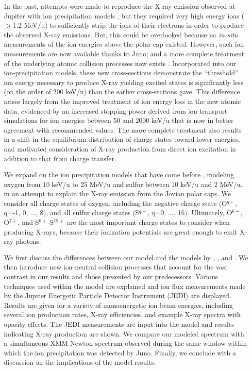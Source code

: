 \documentclass[draft]{agujournal2018}
\begin{document}
In the past, attempts were made to reproduce the X-ray emission observed at Jupiter with ion precipitation models \citep{cravens1995,cravens2003,ozak2010,ozak2013}, but they required very high energy ions ($>$1.2 MeV/u) to sufficiently strip the ions of their electrons in order to produce the observed X-ray emissions.
But, this could be overlooked because no \textit{in situ} measurements of the ion energies above the polar cap existed.
However, such ion measurements are now available thanks to Juno; and a more complete treatment of the underlying atomic collision processes now exists \citep{gharibnejad2019,schultz2019}.
Incorporated into our ion-precipitation models, these new cross-sections demonstrate the ``threshold'' ion energy necessary to produce X-ray yielding excited states is significantly less (on the order of 200 keV/u) than the earlier cross-sections gave.
This difference arises largely from the improved treatment of ion energy loss in the new atomic data, evidenced by an increased stopping power derived from ion-transport simulations for ion energies between 50 and 2000 keV/u that is now in better agreement with recommended values.
The more complete treatment also results in a shift in the equilibrium distribution of charge states toward lower energies, and motivated consideration of X-ray production from direct ion excitation in addition to that from charge transfer.

We expand on the ion precipitation models that have come before \citep{cravens1995,houston2018,ozak2010,ozak2013}, modeling oxygen from 10 keV/u to 25 MeV/u and sulfur between 10 keV/u and 2 MeV/u, in an attempt to explain the X-ray emission from the Jovian polar caps.
We consider all charge states of oxygen, including the negative charge state (O$^{q+}$, q=-1, 0, ..., 8), and all sulfur charge states (S$^{q+}$, q=0, ..., 16).
Ultimately, O$^{6+}$, O$^{7+}$, and S$^{6+}$-S$^{15+}$ are the most important charge states to consider when producing X-rays, because their ionization potentials are great enough to emit X-ray photons.

We first discuss the differences between our model and the models by \citet{houston2018}, \citet{ozak2010}, and \citet{ozak2013}.
We then introduce new ion-neutral collision processes that account for the vast contrast in our results and those presented by our predecessors.
Various techniques used within the model are explained and ion flux measurements made by the Jupiter Energetic Particle Detector Instrument (JEDI) \citep{mauk2017ssr} are displayed.
Results are given for a variety of monoenergetic ion beam energies, including several ion production rates, X-ray efficiencies, and example X-ray spectra with opacity effects.
The JEDI measurements are input into the model and results indicating X-ray production are shown.
We compare our modeled spectrum with a simultaneous XMM-Newton spectrum observed during the same window within which the ion precipitation was detected by Juno.
Finally, we conclude with a discussion on the implications of the model results.
\end{document}
